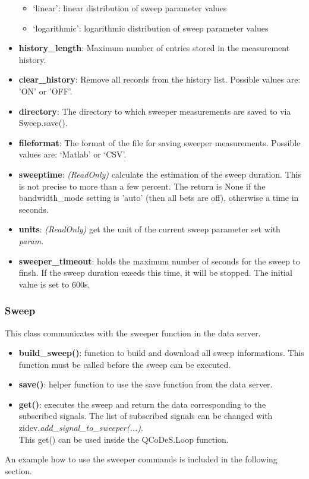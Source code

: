 \documentclass[11pt]{article} %
\begin{document}
\begin{itemize}
\begin{itemize}[]
	\item `linear': linear distribution of sweep parameter values
	\item `logarithmic': logarithmic distribution of sweep parameter values
\end{itemize}
\item {\bf history\_length}: Maximum number of entries stored in the measurement history.
\item {\bf clear\_history}: Remove all records from the history list. Possible values are: 'ON' or 'OFF'.
\item {\bf directory}: The directory to which sweeper measurements are saved to via Sweep.save().
\item {\bf fileformat}: The format of the file for saving sweeper measurements. Possible values are: `Matlab' or `CSV'.
\item {\bf sweeptime}: {\it (ReadOnly)} calculate the estimation of the sweep duration. This is not precise to more than a few percent. The return is None if the bandwidth\_mode setting is 'auto' (then all bets are off), otherwise a time in seconds.
\item {\bf units}: {\it (ReadOnly)} get the unit of the current sweep parameter set with {\it param}.
\item {\bf sweeper\_timeout}: holds the maximum number of seconds for the sweep to finsh. If the sweep duration exeeds this time, it will be stopped. The initial value is set to 600s.
\end{itemize}

\subsubsection{Sweep}
This class communicates with the sweeper function in the data server.
\begin{itemize}
\item {\bf build\_sweep()}: function to build and download all sweep informations. This function must be called before the sweep can be executed.
\item {\bf save()}: helper function to use the save function from the data server.
\item {\bf get()}: executes the sweep and return the data corresponding to the subscribed signals. The list of subscribed signals can be changed with zidev.{\it add\_signal\_to\_sweeper(...)}. \\
This get() can be used inside the QCoDeS.Loop function.
\end{itemize}
An example how to use the sweeper commands is included in the following section.
\end{document}

